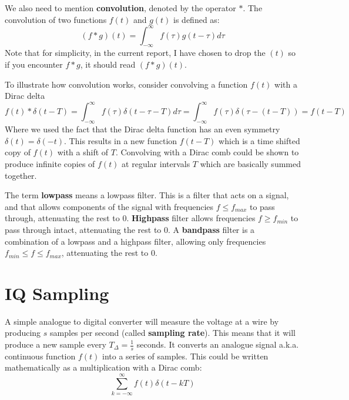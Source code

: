 \documentclass[a4paper,12pt,twoside,openright]{report}
\begin{document}
We also need to mention \textbf{convolution}, denoted by the operator $\ast$. The convolution of two functions $f(t)$ and $g(t)$ is defined as:
$$(f \ast g)(t) = \int_{-\infty}^{\infty} f(\tau) g(t - \tau) d \tau$$
Note that for simplicity, in the current report, I have chosen to drop the $(t)$ so if you encounter $f \ast g$, it should read $(f \ast g)(t)$.

To illustrate how convolution works, consider convolving a function $f(t)$ with a Dirac delta
$$ f(t) \ast \delta(t-T) =  \int_{-\infty}^{\infty} f(\tau) \delta(t - \tau - T ) d \tau = \int_{-\infty}^{\infty} f(\tau) \delta( \tau - ( t -T) ) = f(t-T)$$
Where we used the fact that the Dirac delta function has an even symmetry $\delta(t) = \delta(-t)$. This results in a new function $f(t-T)$ which is a time shifted copy of $f(t)$ with a shift of $T$. Convolving with a Dirac comb could be shown to produce infinite copies of $f(t)$ at regular intervals $T$ which are basically summed together.

The term \textbf{lowpass} means a lowpass filter. This is a filter that acts on a signal, and that allows components of the signal with frequencies $f \leq f_{max}$ to pass through, attenuating the rest to 0. \textbf{Highpass} filter allows frequencies $f \geq f_{min}$ to pass through intact, attenuating the rest to 0. A \textbf{bandpass} filter is a combination of a lowpass and a highpass filter, allowing only frequencies $f_{min} \leq f \leq f_{max}$, attenuating the rest to 0.

\section{IQ Sampling} 
\label{sec:IQSampling}

A simple analogue to digital converter will measure the voltage at a wire by producing $s$ samples per second (called \textbf{sampling rate}). This means that it will produce a new sample every $T_{\Delta} = \frac{1}{s}$ seconds. It converts an analogue signal a.k.a. continuous function $f(t)$ into a series of samples. This could be written mathematically as a multiplication with a Dirac comb:
\begin{equation}
\label{eq:sampling}
\sum_{k=-\infty}^{\infty} f(t) \delta(t - kT)
\end{equation}
\end{document}
